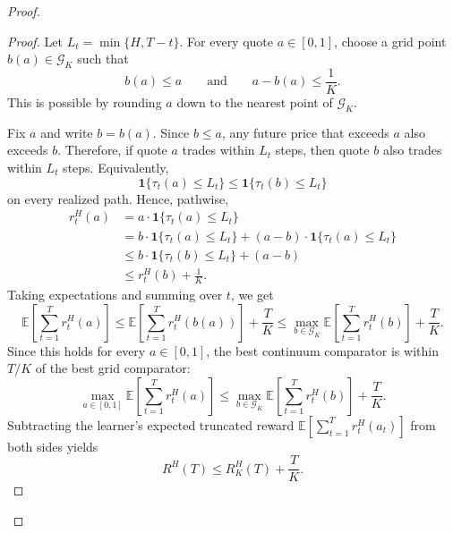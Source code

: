 \documentclass[11pt]{article}
\newcommand{\ind}[1]{\mathbf{1}\{#1\}}
\begin{document}
\begin{proof}
\begin{proof}
Let \(L_t = \min\{H,T-t\}\). For every quote \(a \in [0,1]\), choose a grid
point \(b(a) \in \mathcal{G}_K\) such that
\[
    b(a) \leq a
    \qquad\text{and}\qquad
    a - b(a) \leq \frac{1}{K}.
\]
This is possible by rounding \(a\) down to the nearest point of
\(\mathcal{G}_K\).

Fix \(a\) and write \(b = b(a)\). Since \(b \leq a\), any future price that
exceeds \(a\) also exceeds \(b\). Therefore, if quote \(a\) trades within
\(L_t\) steps, then quote \(b\) also trades within \(L_t\) steps. Equivalently,
\[
    \ind{\tau_t(a) \leq L_t}
    \leq
    \ind{\tau_t(b) \leq L_t}
\]
on every realized path. Hence, pathwise,
\[
\begin{aligned}
    r^H_t(a)
    &=
    a\cdot \ind{\tau_t(a) \leq L_t} \\
    &=
    b\cdot \ind{\tau_t(a) \leq L_t}
    +
    (a-b)\cdot \ind{\tau_t(a) \leq L_t} \\
    &\leq
    b\cdot \ind{\tau_t(b) \leq L_t}
    +
    (a-b) \\
    &\leq
    r^H_t(b) + \frac{1}{K}.
\end{aligned}
\]
Taking expectations and summing over \(t\), we get
\[
    \mathbb{E}\left[\sum_{t=1}^T r^H_t(a)\right]
    \leq
    \mathbb{E}\left[\sum_{t=1}^T r^H_t(b(a))\right]
    +
    \frac{T}{K}
    \leq
    \max_{b \in \mathcal{G}_K}
    \mathbb{E}\left[\sum_{t=1}^T r^H_t(b)\right]
    +
    \frac{T}{K}.
\]
Since this holds for every \(a \in [0,1]\), the best continuum comparator is
within \(T/K\) of the best grid comparator:
\[
    \max_{a \in [0,1]}
    \mathbb{E}\left[\sum_{t=1}^T r^H_t(a)\right]
    \leq
    \max_{b \in \mathcal{G}_K}
    \mathbb{E}\left[\sum_{t=1}^T r^H_t(b)\right]
    +
    \frac{T}{K}.
\]
Subtracting the learner's expected truncated reward
\(\mathbb{E}\left[\sum_{t=1}^T r^H_t(a_t)\right]\) from both sides yields
\[
    R^H(T) \leq R^H_K(T) + \frac{T}{K}.
\]
\end{proof}


\end{proof}
\end{document}
